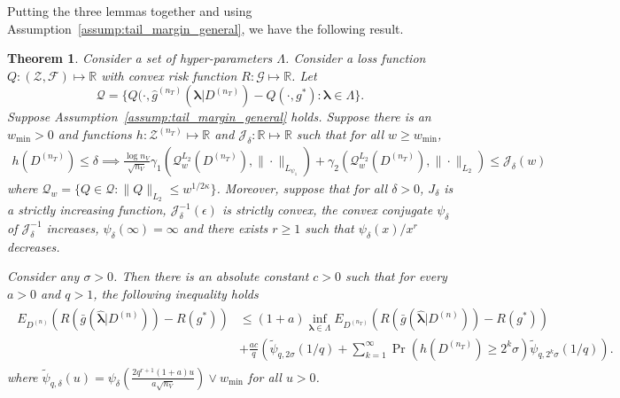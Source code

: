 \documentclass[10pt]{book}
\newtheorem{theorem}{Theorem}
\theoremstyle{definition}
\begin{document}
Putting the three lemmas together and using Assumption~\ref{assump:tail_margin_general}, we have the following result.
\begin{theorem}
	\label{thrm:jean_cv}
	Consider a set of hyper-parameters $\Lambda$. Consider a loss function $Q:(\mathcal{Z}, \mathcal{F}) \mapsto \mathbb{R}$ with convex risk function $R: \mathcal{G} \mapsto \mathbb{R}$. Let
	$$
	\mathcal{Q} = \{ 
	Q(\cdot, \hat{g}^{(n_T)}(\boldsymbol{\lambda} | D^{(n_T)}) - Q(\cdot, g^*) : \boldsymbol{\lambda} \in \Lambda \}.
	$$
	Suppose Assumption~\ref{assump:tail_margin_general} holds.
	Suppose there is an $w_{\min} > 0$ and
	functions $h: {\mathcal{Z}}^{(n_T)} \mapsto \mathbb{R}$
	and $\mathcal{J}_\delta: \mathbb{R}\mapsto \mathbb{R}$ such that
	for all $w \ge w_{\min}$,
	\begin{align}
	\label{eq:h_to_J}
	h(D^{(n_{T})})\le\delta\implies
	\frac{\log n_{V}}{\sqrt{n_{V}}}
	\gamma_{1}\left(\mathcal{Q}_{w}^{L_{2}}(D^{(n_{T})}),\|\cdot\|_{L_{\psi_{1}}}\right)
	+\gamma_{2}\left(\mathcal{Q}_{w}^{L_{2}}(D^{(n_{T})}),\|\cdot\|_{L_{2}}\right)\le \mathcal{J}_{\delta}(w)
	\end{align}
	where $\mathcal{Q}_w = \{Q \in \mathcal{Q}: \| Q \|_{L_2} \le w^{1/2\kappa} \}$.
	Moreover, suppose that for all $\delta > 0$, $J_\delta$ is a strictly increasing function, $\mathcal{J}_\delta^{-1}(\epsilon)$ is strictly convex,
	the convex conjugate $\psi_\delta$ of $\mathcal{J}^{-1}_\delta$ increases, $\psi_\delta(\infty ) = \infty$ and there exists $r \ge 1$ such that $\psi_\delta(x)/x^r$ decreases.
	
	Consider any $\sigma > 0$. Then there is an absolute constant $c > 0$ such that for every $a > 0$ and $q > 1$, the following inequality holds
	\begin{align}
	\begin{split}
	E_{D^{(n)}} 
	\left(
	R\left(\bar{g} ( \hat{\boldsymbol \lambda} | {D^{(n)}} ) \right )
	- R (g^*)
	\right)
	&\le
	(1+a) \inf_{\boldsymbol{\lambda} \in \Lambda} 
	E_{D^{(n_T)}}
	\left(
	R\left(\bar{g} ( \hat{\boldsymbol \lambda} | {D^{(n)}} ) \right )
	- R (g^*)
	\right)
	\\
	& +
	\frac{ac}{q}
	\left(
	\tilde{\psi}_{q,2\sigma}(1/q)
	+\sum_{k=1}^{\infty}
	\Pr\left(h\left(D^{(n_{T})}\right)\ge2^{k}\sigma\right)
	\tilde{\psi}_{q,2^{k}\sigma}(1/q)
	\right).
	\label{eq:cv_oracle_ineq}
	\end{split}
	\end{align}
	where $\tilde{\psi}_{q, \delta}(u) = \psi_\delta\left(\frac{2q^{r+1}(1 + a)u}{a\sqrt{n_V}}\right) \vee w_{\min}$ for all $u > 0$.
\end{theorem}
\end{document}
